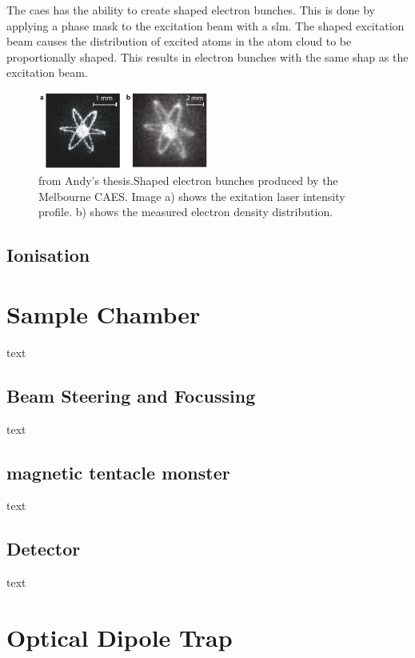 The \gls{caes} has the ability to create shaped electron bunches. This is done by applying a phase mask to the excitation beam with a \gls{slm}. The shaped excitation beam causes the distribution of excited atoms in the atom cloud to be proportionally shaped. This results in electron bunches with the same shap as the excitation beam.

\begin{figure}[h]
\centering
\includegraphics[width=0.5\textwidth]{figs/atom_electrons.pdf}
\caption{{\color{red}from Andy's thesis.}Shaped electron bunches produced by the Melbourne CAES. Image a) shows the exitation laser intensity profile. b) shows the measured electron density distribution.}
\end{figure}

\subsection{Ionisation}



\section{Sample Chamber}
text
    \subsection{Beam Steering and Focussing}
text
    \subsection{magnetic tentacle monster}
text
    \subsection{Detector}
text
\section{Optical Dipole Trap}

